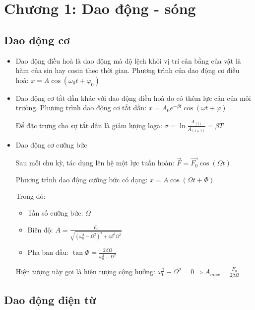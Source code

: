 \documentclass[12pt,a4paper]{article}
\begin{document}
\section*{Chương 1: Dao động - sóng}

\subsection*{Dao động cơ}
\begin{itemize}
    \item Dao động điều hoà là dao động mà độ lệch khỏi vị trí cân bằng của vật là hàm của sin hay cosin theo thời gian. Phương trình của dao động cơ điều hoà: $x = A \cos(\omega_0 t + \varphi_0)$
    \item Dao động cơ tắt dần khác với dao động điều hoà do có thêm lực cản của môi trường. Phương trình dao động cơ tắt dần: $x = A_0 e^{-\beta t} \cos(\omega t + \varphi)$  
    
    Để đặc trưng cho sự tắt dần là giảm lượng loga: $\sigma = \ln\frac{A_(t)}{A_(t+T)} = \beta T$
    \item Dao động cơ cưỡng bức
    
    Sau mỗi chu kỳ, tác dụng lên hệ một lực tuần hoàn: $\vec{F} = \vec{F_0} \cos(\Omega t)$

    Phương trình dao động cưỡng bức có dạng: $x = A \cos(\Omega t + \Phi)$

    Trong đó:
    \begin{itemize}
        \item Tần số cưỡng bức: $\Omega$
        \item Biên độ: $A = \frac{F_0}{\sqrt{(\omega_0^2 - \Omega^2)^2 + 4\beta^2 \Omega^2}}$
        \item Pha ban đầu: $\tan \Phi = \frac{2\beta \Omega}{\omega_0^2 - \Omega^2}$
    \end{itemize}

    Hiện tượng này gọi là hiện tượng cộng hưởng: $\omega^2_0 - \Omega^2 = 0 \Rightarrow A_{max} = \frac{F_0}{2\beta \Omega}$
\end{itemize}

\subsection*{Dao động điện từ}
\end{document}
